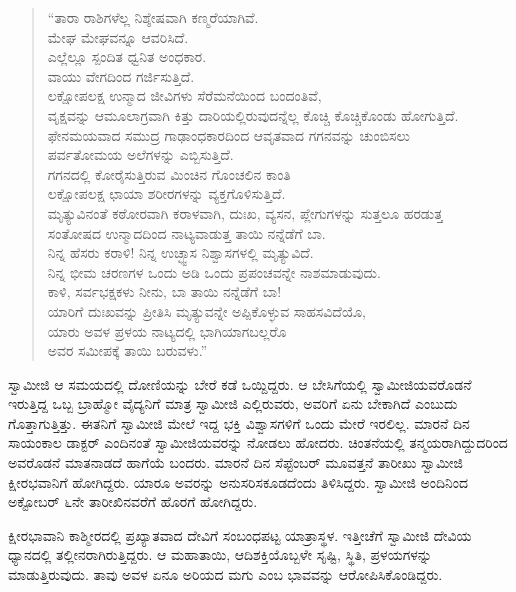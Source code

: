 \begin{verse}
“ತಾರಾ ರಾಶಿಗಳೆಲ್ಲ ನಿಶ್ಶೇಷವಾಗಿ ಕಣ್ಮರೆಯಾಗಿವೆ.\\ಮೇಘ ಮೇಘವನ್ನೂ ಆವರಿಸಿದೆ.\\ಎಲ್ಲೆಲ್ಲೂ ಸ್ಪಂದಿತ ಧ್ವನಿತ ಅಂಧಕಾರ.\\ವಾಯು ವೇಗದಿಂದ ಗರ್ಜಿಸುತ್ತಿದೆ.\\ಲಕ್ಷೋಪಲಕ್ಷ ಉನ್ಮಾದ ಜೀವಿಗಳು ಸೆರೆಮನೆಯಿಂದ ಬಂದಂತಿವೆ,\\ವೃಕ್ಷವನ್ನು ಆಮೂಲಾಗ್ರವಾಗಿ ಕಿತ್ತು ದಾರಿಯಲ್ಲಿರುವುದನ್ನೆಲ್ಲ ಕೊಚ್ಚಿ ಕೊಚ್ಚಿಕೊಂಡು ಹೋಗುತ್ತಿದೆ.\\ಫೇನಮಯವಾದ ಸಮುದ್ರ ಗಾಢಾಂಧಕಾರದಿಂದ ಆವೃತವಾದ ಗಗನವನ್ನು ಚುಂಬಿಸಲು\\ಪರ್ವತೋಮಯ ಅಲೆಗಳನ್ನು ಎಬ್ಬಿಸುತ್ತಿದೆ.\\ಗಗನದಲ್ಲಿ ಕೋರೈಸುತ್ತಿರುವ ಮಿಂಚಿನ ಗೊಂಚಲಿನ ಕಾಂತಿ\\ಲಕ್ಷೋಪಲಕ್ಷ ಛಾಯಾ ಶರೀರಗಳನ್ನು ವ್ಯಕ್ತಗೊಳಿಸುತ್ತಿದೆ.\\ಮೃತ್ಯುವಿನಂತೆ ಕಠೋರವಾಗಿ ಕರಾಳವಾಗಿ, ದುಃಖ, ವ್ಯಸನ, ಪ್ಲೇಗುಗಳನ್ನು ಸುತ್ತಲೂ ಹರಡುತ್ತ\\ಸಂತೋಷದ ಉನ್ಮಾದದಿಂದ ನಾಟ್ಯವಾಡುತ್ತ ತಾಯಿ ನನ್ನೆಡೆಗೆ ಬಾ.\\ನಿನ್ನ ಹೆಸರು ಕರಾಳಿ! ನಿನ್ನ ಉಚ್ಛ್ವಾಸ ನಿಶ್ವಾಸಗಳಲ್ಲಿ ಮೃತ್ಯುವಿದೆ.\\ನಿನ್ನ ಭೀಮ ಚರಣಗಳ ಒಂದು ಅಡಿ ಒಂದು ಪ್ರಪಂಚವನ್ನೇ ನಾಶಮಾಡುವುದು.\\ಕಾಳಿ, ಸರ್ವಭಕ್ಷಕಳು ನೀನು, ಬಾ ತಾಯಿ ನನ್ನೆಡೆಗೆ ಬಾ!\\ಯಾರಿಗೆ ದುಃಖವನ್ನು ಪ್ರೀತಿಸಿ ಮೃತ್ಯುವನ್ನೇ ಅಪ್ಪಿಕೊಳ್ಳುವ ಸಾಹಸ\-ವಿದೆಯೊ,\\ಯಾರು ಅವಳ ಪ್ರಳಯ ನಾಟ್ಯದಲ್ಲಿ ಭಾಗಿಯಾಗಬಲ್ಲರೊ\\ಅವರ ಸಮೀಪಕ್ಕೆ ತಾಯಿ ಬರುವಳು.”
\end{verse}

\vskip 2pt

 ಸ್ವಾಮೀಜಿ ಆ ಸಮಯದಲ್ಲಿ ದೋಣಿಯನ್ನು ಬೇರೆ ಕಡೆ ಒಯ್ದಿದ್ದರು. ಆ ಬೇಸಿಗೆಯಲ್ಲಿ ಸ್ವಾಮೀಜಿಯವರೊಡನೆ ಇರುತ್ತಿದ್ದ ಒಬ್ಬ ಬ್ರಾಹ್ಮೋ ವೈದ್ಯನಿಗೆ ಮಾತ್ರ ಸ್ವಾಮೀಜಿ ಎಲ್ಲಿರುವರು, ಅವರಿಗೆ ಏನು ಬೇಕಾಗಿದೆ ಎಂಬುದು ಗೊತ್ತಾಗುತ್ತಿತ್ತು. ಈತನಿಗೆ ಸ್ವಾಮೀಜಿ ಮೇಲೆ ಇದ್ದ ಭಕ್ತಿ ವಿಶ್ವಾಸಗಳಿಗೆ ಒಂದು ಮೇರೆ ಇರಲಿಲ್ಲ. ಮಾರನೆ ದಿನ ಸಾಯಂಕಾಲ ಡಾಕ್ಟರ್ ಎಂದಿನಂತೆ ಸ್ವಾಮೀಜಿಯವರನ್ನು ನೋಡಲು ಹೋದರು. ಚಿಂತನೆಯಲ್ಲಿ ತನ್ಮಯರಾಗಿದ್ದುದರಿಂದ ಅವರೊಡನೆ ಮಾತನಾಡದೆ ಹಾಗೆಯೆ ಬಂದರು. ಮಾರನೆ ದಿನ ಸೆಪ್ಟೆಂಬರ್ ಮೂವತ್ತನೆ ತಾರೀಖು ಸ್ವಾಮೀಜಿ ಕ್ಷೀರಭವಾನಿಗೆ ಹೋಗಿದ್ದರು. ಯಾರೂ ಅವರನ್ನು ಅನುಸರಿಸಕೂಡದೆಂದು ತಿಳಿಸಿದ್ದರು. ಸ್ವಾಮೀಜಿ ಅಂದಿನಿಂದ ಅಕ್ಟೋಬರ್ ೬ನೇ ತಾರೀಖಿನವರೆಗೆ ಹೊರಗೆ ಹೋಗಿದ್ದರು. 

\vskip 2pt

 ಕ್ಷೀರಭಾವಾನಿ ಕಾಶ್ಮೀರದಲ್ಲಿ ಪ್ರಖ್ಯಾತವಾದ ದೇವಿಗೆ ಸಂಬಂಧಪಟ್ಟ ಯಾತ್ರಾಸ್ಥಳ. ಇತ್ತೀಚೆಗೆ ಸ್ವಾಮೀಜಿ ದೇವಿಯ ಧ್ಯಾನದಲ್ಲಿ ತಲ್ಲೀನರಾಗಿರುತ್ತಿದ್ದರು. ಆ ಮಹಾತಾಯಿ, ಆದಿಶಕ್ತಿಯೊಬ್ಬಳೇ ಸೃಷ್ಟಿ, ಸ್ಥಿತಿ, ಪ್ರಳಯಗಳನ್ನು ಮಾಡುತ್ತಿರುವುದು. ತಾವು ಅವಳ ಏನೂ ಅರಿಯದ ಮಗು ಎಂಬ ಭಾವವನ್ನು ಆರೋಪಿಸಿಕೊಂಡಿದ್ದರು. 

